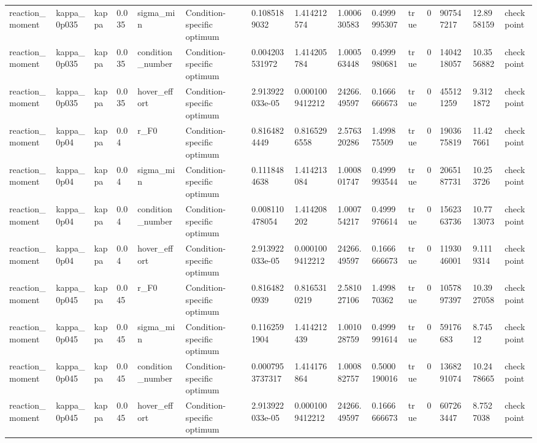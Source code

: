 \begin{tabular}{@{}lllllllllllllll@{}}
reaction\_moment & kappa\_0p035 & kappa & 0.035 & sigma\_min & Condition-specific optimum & 0.1085189032 & 1.414212574 & 1.000630583 & 0.4999995307 & true & 0 & 907547217 & 12.8958159 & checkpoint \\
reaction\_moment & kappa\_0p035 & kappa & 0.035 & condition\_number & Condition-specific optimum & 0.004203531972 & 1.414205784 & 1.000563448 & 0.4999980681 & true & 0 & 1404218057 & 10.3556882 & checkpoint \\
reaction\_moment & kappa\_0p035 & kappa & 0.035 & hover\_effort & Condition-specific optimum & 2.913922033e-05 & 0.0001009412212 & 24266.49597 & 0.1666666673 & true & 0 & 455121259 & 9.3121872 & checkpoint \\
reaction\_moment & kappa\_0p04 & kappa & 0.04 & r\_F0 & Condition-specific optimum & 0.8164824449 & 0.8165296558 & 2.576320286 & 1.499875509 & true & 0 & 1903675819 & 11.427661 & checkpoint \\
reaction\_moment & kappa\_0p04 & kappa & 0.04 & sigma\_min & Condition-specific optimum & 0.1118484638 & 1.414213084 & 1.000801747 & 0.4999993544 & true & 0 & 2065187731 & 10.253726 & checkpoint \\
reaction\_moment & kappa\_0p04 & kappa & 0.04 & condition\_number & Condition-specific optimum & 0.008110478054 & 1.414208202 & 1.000754217 & 0.4999976614 & true & 0 & 1562363736 & 10.7713073 & checkpoint \\
reaction\_moment & kappa\_0p04 & kappa & 0.04 & hover\_effort & Condition-specific optimum & 2.913922033e-05 & 0.0001009412212 & 24266.49597 & 0.1666666673 & true & 0 & 1193046001 & 9.1119314 & checkpoint \\
reaction\_moment & kappa\_0p045 & kappa & 0.045 & r\_F0 & Condition-specific optimum & 0.8164820939 & 0.8165310219 & 2.581027106 & 1.499870362 & true & 0 & 1057897397 & 10.3927058 & checkpoint \\
reaction\_moment & kappa\_0p045 & kappa & 0.045 & sigma\_min & Condition-specific optimum & 0.1162591904 & 1.414212439 & 1.001028759 & 0.4999991614 & true & 0 & 59176683 & 8.74512 & checkpoint \\
reaction\_moment & kappa\_0p045 & kappa & 0.045 & condition\_number & Condition-specific optimum & 0.0007953737317 & 1.414176864 & 1.000882757 & 0.5000190016 & true & 0 & 1368291074 & 10.2478665 & checkpoint \\
reaction\_moment & kappa\_0p045 & kappa & 0.045 & hover\_effort & Condition-specific optimum & 2.913922033e-05 & 0.0001009412212 & 24266.49597 & 0.1666666673 & true & 0 & 607263447 & 8.7527038 & checkpoint \\

\end{tabular}
